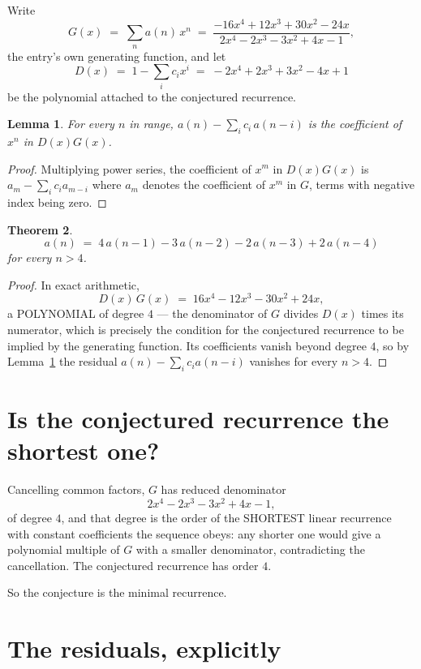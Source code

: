 \documentclass[11pt,a4paper]{article}
\theoremstyle{plain}
\newtheorem{theorem}{Theorem}
\newtheorem{lemma}[theorem]{Lemma}
\theoremstyle{definition}
\begin{document}
Write
\[
G(x)\;=\;\sum_{n}a(n)\,x^{n}\;=\;\frac{- 16 x^{4} + 12 x^{3} + 30 x^{2} - 24 x}{2 x^{4} - 2 x^{3} - 3 x^{2} + 4 x - 1},
\]
the entry's own generating function, and let
\[
D(x)\;=\;1-\sum_i c_i x^{i}\;=\;- 2 x^{4} + 2 x^{3} + 3 x^{2} - 4 x + 1
\]
be the polynomial attached to the conjectured recurrence.

\begin{lemma}\label{lem:key}
For every $n$ in range, $a(n)-\sum_i c_i\,a(n-i)$ is the coefficient of $x^{n}$ in
$D(x)G(x)$.
\end{lemma}

\begin{proof}
Multiplying power series, the coefficient of $x^{m}$ in $D(x)G(x)$ is
$a_m-\sum_i c_i a_{m-i}$ where $a_m$ denotes the coefficient of $x^{m}$ in $G$, terms with
negative index being zero.
\end{proof}

\begin{theorem}
\[
a(n)\;=\;4\,a(n-1) - 3\,a(n-2) - 2\,a(n-3) + 2\,a(n-4)
\]
for every $n>4$.
\end{theorem}

\begin{proof}
In exact arithmetic,
\[
D(x)\,G(x)\;=\;16 x^{4} - 12 x^{3} - 30 x^{2} + 24 x,
\]
a POLYNOMIAL of degree $4$ --- the denominator of $G$ divides $D(x)$ times its numerator,
which is precisely the condition for the conjectured recurrence to be implied by the
generating function. Its coefficients vanish beyond degree $4$, so by
Lemma~\ref{lem:key} the residual $a(n)-\sum_ic_ia(n-i)$ vanishes for every
$n>4$.
\end{proof}

\section{Is the conjectured recurrence the shortest one?}

Cancelling common factors, $G$ has reduced denominator
\[
2 x^{4} - 2 x^{3} - 3 x^{2} + 4 x - 1,
\]
of degree $4$, and that degree is the order of the SHORTEST linear recurrence with
constant coefficients the sequence obeys: any shorter one would give a polynomial multiple of
$G$ with a smaller denominator, contradicting the cancellation. The conjectured recurrence has
order $4$.

So the conjecture is the minimal recurrence.

\section{The residuals, explicitly}
\end{document}
